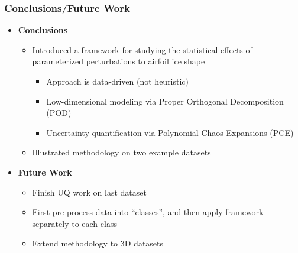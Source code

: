 \documentclass[9pt]{beamer}
\begin{document}
\begin{frame}
\frametitle{Conclusions/Future Work}
\label{sec-4-5}


\begin{itemize}
\item \textbf{Conclusions}
\begin{itemize}
\item Introduced a framework for studying the statistical effects of
    parameterized perturbations to airfoil ice shape
\begin{itemize}
\item Approach is data-driven (not heuristic)
\item Low-dimensional modeling via Proper Orthogonal Decomposition (POD)
\item Uncertainty quantification via Polynomial Chaos Expansions (PCE)
\end{itemize}
\item Illustrated methodology on two example datasets
\end{itemize}
\item \textbf{Future Work}
\begin{itemize}
\item Finish UQ work on last dataset
\item First pre-process data into ``classes'', and then apply framework
    separately to each class
\item Extend methodology to 3D datasets
\end{itemize}
\end{itemize}
\end{frame}
\end{document}
